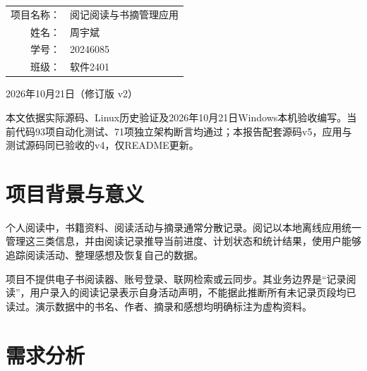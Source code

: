 \documentclass[UTF8,a4paper,11pt,fontset=none]{ctexart}
\begin{document}
\begin{titlepage}\centering
\vspace*{22mm}{\LARGE 全栈开发技术期末项目报告\par}
\vspace{22mm}{\Huge\bfseries 阅记\par}\vspace{5mm}{\Large 阅读与书摘管理应用\par}
\vspace{24mm}\begin{tabular}{rl}项目名称：&阅记阅读与书摘管理应用\\姓名：&周宇斌\\学号：&20246085\\班级：&软件2401\end{tabular}
\vfill{\large 2026年10月21日（修订版 v2）\par}\vspace{12mm}
\begin{minipage}{.85\linewidth}\small
本文依据实际源码、Linux历史验证及2026年10月21日Windows本机验收编写。当前代码93项自动化测试、71项独立架构断言均通过；本报告配套源码v5，应用与测试源码同已验收的v4，仅README更新。
\end{minipage}
\end{titlepage}
\tableofcontents\newpage
\section*{项目背景与意义}
个人阅读中，书籍资料、阅读活动与摘录通常分散记录。阅记以本地离线应用统一管理这三类信息，并由阅读记录推导当前进度、计划状态和统计结果，使用户能够追踪阅读活动、整理感想及恢复自己的数据。

项目不提供电子书阅读器、账号登录、联网检索或云同步。其业务边界是“记录阅读”，用户录入的阅读记录表示自身活动声明，不能据此推断所有未记录页段均已读过。演示数据中的书名、作者、摘录和感想均明确标注为虚构资料。
\section{需求分析}
\end{document}
